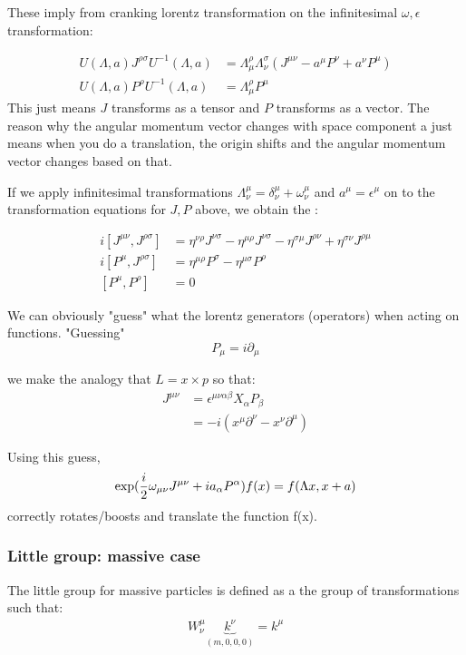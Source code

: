 \documentclass[12pt]{scrartcl}
\begin{document}
These imply from cranking lorentz transformation on the infinitesimal $\omega, \epsilon$ transformation:

\begin{align}
U(\Lambda, a) J^{\rho \sigma} U^{-1} (\Lambda, a) &= \Lambda_\mu^\rho \Lambda_\nu^\sigma (J^{\mu \nu} - a^\mu P^\nu + a^\nu P^\mu) \\
U(\Lambda, a) P^{\rho} U^{-1} (\Lambda, a)&= \Lambda_\mu^\rho P^\mu
\end{align}
This just means $J$ transforms as a tensor and $P$ transforms as a vector. The reason why the angular momentum vector changes with space component a just means when you do a translation, the origin shifts and the angular momentum vector changes based on that.

If we apply infinitesimal transformations $\Lambda^\mu_\nu = \delta^\mu_\nu + \omega^\mu_\nu$ and $a^\mu = \epsilon^\mu$ on to the transformation equations for $J, P$ above, we obtain the :

\begin{align}
i [J^{\mu \nu}, J^{\rho \sigma}] &= \eta^{\nu \rho} J^{\nu \sigma} - \eta^{\mu \rho} J^{\nu \sigma} - \eta^{\sigma \mu} J^{\rho \nu} + \eta^{\sigma \nu} J^{\rho \mu} \\
i [P^\mu, J^{\rho \sigma}] &= \eta^{\mu \rho} P^\sigma - \eta^{\mu \sigma} P^\rho \\
[P^\mu, P^\rho] &= 0
\end{align} 

We can obviously "guess" what the lorentz generators (operators) when acting on functions.  "Guessing"
$$P_\mu = i \partial_\mu$$

we make the analogy that $L = x \times p$ so that:
\begin{align}
J^{\mu \nu} &= \epsilon^{\mu \nu \alpha \beta} X_{\alpha} P_{\beta} \\
&= -i (x^{\mu} \partial^\nu - x^\nu \partial^\mu)
\end{align}

Using this guess, 
$$ \exp({i \over 2} \omega_{\mu \nu} J^{\mu \nu} + i a_\alpha P^\alpha) f(x) = f(\Lambda x, x + a)$$
correctly rotates/boosts and translate the function f(x).

\subsubsection{Little group: massive case}

The little group for massive particles is defined as a the group of transformations such that:
\begin{align}
W^{\mu}_{\nu} \underbrace{k^{\nu} }_{(m, 0, 0, 0)} = k^{\mu} 
\end{align}
\end{document}
